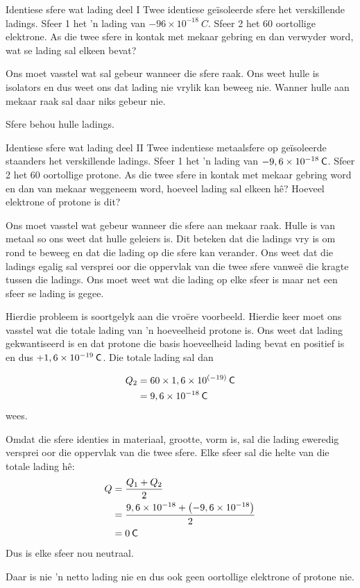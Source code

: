 \begin{wex}
{Identiese sfere wat lading deel I}
{
Twee identiese ge\"isoleerde sfere het verskillende ladings. Sfeer 1 het 'n lading van $-96\times10^{-18}~C$. Sfeer 2 het 60 oortollige elektrone. As die twee sfere in kontak met mekaar gebring en dan verwyder word, wat se lading sal elkeen bevat? 
}
{
Ons moet vasstel wat sal gebeur wanneer die sfere raak. Ons weet hulle is isolators en dus weet ons dat lading nie vrylik kan beweeg nie. Wanner hulle aan mekaar raak sal daar niks gebeur nie. 


Sfere behou hulle ladings.
}\end{wex}


\begin{wex}{Identiese sfere wat lading deel II}
{
Twee indentiese metaalsfere op ge\"isoleerde staanders het verskillende ladings. Sfeer 1 het 'n lading van $-9,6\ensuremath{\times}{10}^{-18}\phantom{\rule{2pt}{0ex}}\mathsf{C}$. Sfeer 2 het 60 oortollige protone. As die twee sfere in kontak met mekaar gebring word en dan van mekaar weggeneem word, hoeveel lading sal elkeen h\^e? Hoeveel elektrone of protone is dit?
}
{
Ons moet vasstel wat gebeur wanneer die sfere aan mekaar raak. Hulle is van metaal so ons weet dat hulle geleiers is. Dit beteken dat die ladings vry is om rond te beweeg en dat die lading op die sfere kan verander. Ons weet dat die ladings egalig sal versprei oor die oppervlak van die twee sfere vanwe\"e die kragte tussen die ladings. Ons moet weet wat die lading op elke sfeer is maar net een sfeer se lading is gegee.

Hierdie probleem is soortgelyk aan die vro\"ere voorbeeld. Hierdie keer moet ons vasstel wat die totale lading van 'n hoeveelheid protone is. Ons weet dat lading gekwantiseerd is en dat protone die basis hoeveelheid lading bevat en positief is en dus $+1,6\ensuremath{\times}{10}^{-19}\phantom{\rule{2pt}{0ex}}\mathsf{C}$. Die totale lading sal dan

\begin{align*}
{Q}_{2} &= 60\ensuremath{\times}1,6\ensuremath{\times}{10}^{\left(-19\right)}\phantom{\rule{2pt}{0ex}}\mathsf{C}\\ 
&= 9,6\ensuremath{\times}{10}^{-18}\phantom{\rule{2pt}{0ex}}\mathsf{C}
\end{align*}
wees.\par
Omdat die sfere identies in materiaal, grootte, vorm is, sal die lading eweredig versprei oor die oppervlak van die twee sfere. Elke sfeer sal die helte van die totale lading h\^e:
\begin{align*}
Q &= \dfrac{{Q}_{1}+{Q}_{2}}{2}\\ 
  &= \dfrac{9,6\ensuremath{\times}{10}^{-18}+\left(-9,6\ensuremath{\times}{10}^{-18}\right)}{2}\\ 
  &= 0\phantom{\rule{2pt}{0ex}}\mathsf{C}
\end{align*}
Dus is elke sfeer nou neutraal.\par

Daar is nie 'n netto lading nie en dus ook geen oortollige elektrone of protone nie.
}
\end{wex}


